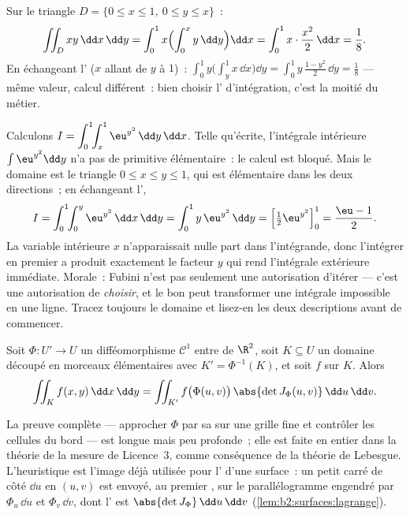 \begin{example}\label{ex:b2:multint:triangle}
Sur le triangle $D = \{0 \leq x \leq 1,\ 0 \leq y \leq x\}$~:
\[
\iint_D xy \,\dd x\,\dd y
= \int_0^1 x\Bigl(\int_0^x y\,\dd y\Bigr)\dd x
= \int_0^1 x\cdot\frac{x^2}{2}\,\dd x = \frac18 .
\]
En échangeant l' ($x$ allant de $y$ à $1$)~: $\int_0^1
y\bigl(\int_y^1 x\,\dd x\bigr)\dd y = \int_0^1
y\,\frac{1 - y^2}{2}\,\dd y = \frac18$ --- même valeur, calcul
différent~: bien choisir l' d'intégration, c'est la moitié du
métier.
\end{example}

\begin{example}\label{ex:b2:multint:swaporder}
Calculons $I = \displaystyle\int_0^1\!\!\int_x^1
\eu^{y^2}\,\dd y\,\dd x$. Telle qu'écrite, l'intégrale intérieure
$\int\eu^{y^2}\dd y$ n'a pas de primitive élémentaire~: le
calcul est bloqué. Mais le domaine est le triangle $0 \leq
x \leq y \leq 1$, qui est élémentaire dans les deux directions~;
en échangeant l',
\[
I = \int_0^1\!\!\int_0^y \eu^{y^2}\,\dd x\,\dd y
= \int_0^1 y\,\eu^{y^2}\,\dd y
= \Bigl[\tfrac12\eu^{y^2}\Bigr]_0^1 = \frac{\eu - 1}{2} .
\]
La variable intérieure $x$ n'apparaissait nulle part dans l'intégrande,
donc l'intégrer en premier a produit exactement le facteur $y$ qui
rend l'intégrale extérieure immédiate. Morale~: Fubini n'est pas
seulement une autorisation d'itérer --- c'est une autorisation de
\emph{choisir}, et le bon  peut transformer une intégrale
impossible en une ligne. Tracez toujours le domaine et lisez-en les
deux descriptions avant de commencer.
\end{example}

\begin{theorem}\label{thm:b2:multint:changevar}
Soit $\Phi \colon U' \to U$ un difféomorphisme $\mathcal{C}^1$
entre  de $\R^2$, soit $K \subseteq U$ un domaine 
découpé en morceaux élémentaires avec $K' = \Phi^{-1}(K)$, et
soit $f$  sur $K$. Alors
\[
\iint_K f(x, y)\,\dd x\,\dd y
= \iint_{K'} f\bigl(\Phi(u, v)\bigr)\,
\abs{\det J_\Phi(u, v)}\,\dd u\,\dd v .
\]
\end{theorem}
\admitted

\begin{remark}
La preuve complète --- approcher $\Phi$ par sa  sur
une grille fine et contrôler les cellules du bord --- est longue mais
peu profonde~; elle est faite en entier dans la théorie de la mesure de
Licence~3, comme conséquence de la théorie de Lebesgue. L'heuristique
est l'image déjà utilisée pour l' d'une surface~: un petit carré
de côté $\dd u$ en $(u, v)$ est envoyé, au premier , sur le
parallélogramme engendré par $\Phi_u\,\dd u$ et $\Phi_v\,\dd v$, dont
l' est $\abs{\det J_\Phi}\,\dd u\,\dd v$
(\cref{lem:b2:surfaces:lagrange}).
\end{remark}

